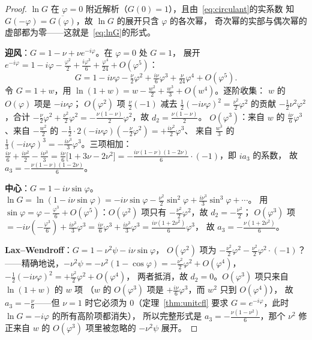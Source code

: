 \begin{proof}
$\ln G$ 在 $\varphi=0$ 附近解析（$G(0)=1$），且由~\eqref{eq:circulant}的实系数
知 $G(-\varphi)=\overline{G(\varphi)}$，故 $\ln G$ 的展开只含 $\varphi$ 的各次幂，
奇次幂的实部与偶次幂的虚部都为零——这就是~\eqref{eq:lnG}的形式。

\textbf{迎风}：$G=1-\nu+\nu e^{-i\varphi}$。在 $\varphi=0$ 处 $G=1$，
展开 $e^{-i\varphi}=1-i\varphi-\tfrac{\varphi^2}{2}+\tfrac{i\varphi^3}{6}+\tfrac{\varphi^4}{24}+O(\varphi^5)$：
\begin{equation}
  G=1-i\nu\varphi-\tfrac{\nu}{2}\varphi^2+\tfrac{i\nu}{6}\varphi^3+\tfrac{\nu}{24}\varphi^4+O(\varphi^5).
\end{equation}
令 $G=1+w$，用 $\ln(1+w)=w-\tfrac{w^2}{2}+\tfrac{w^3}{3}+O(w^4)$。逐阶收集：
$w$ 的 $O(\varphi)$ 项是 $-i\nu\varphi$；
$O(\varphi^2)$ 项 $\tfrac{\nu}{2}(-1)$ 减去 $\tfrac12(-i\nu\varphi)^2=\tfrac{\nu^2}{2}\varphi^2$
的贡献 $-\tfrac12\nu^2\varphi^2$，合计 $-\tfrac{\nu}{2}\varphi^2+\tfrac{\nu^2}{2}\varphi^2
=-\tfrac{\nu(1-\nu)}{2}\varphi^2$，故 $d_2=\tfrac{\nu(1-\nu)}{2}$。
$O(\varphi^3)$：来自 $w$ 的 $\tfrac{i\nu}{6}\varphi^3$、来自 $-\tfrac{w^2}{2}$ 的
$-\tfrac12\cdot 2(-i\nu\varphi)(-\tfrac{\nu}{2}\varphi^2)=+\tfrac{i\nu^2}{2}\varphi^3$、
来自 $\tfrac{w^3}{3}$ 的 $\tfrac13(-i\nu\varphi)^3=-\tfrac{i\nu^3}{3}\varphi^3$。三项相加：
$\tfrac{i\nu}{6}+\tfrac{i\nu^2}{2}-\tfrac{i\nu^3}{3}=\tfrac{i\nu}{6}\bigl[1+3\nu-2\nu^2\bigr]
=-\tfrac{i\nu(1-\nu)(1-2\nu)}{6}\cdot(-1)$，即 $ia_3$ 的系数，
故 $a_3=-\tfrac{\nu(1-\nu)(1-2\nu)}{6}$。

\textbf{中心}：$G=1-i\nu\sin\varphi$。$\ln G=\ln(1-i\nu\sin\varphi)
=-i\nu\sin\varphi-\tfrac{\nu^2}{2}\sin^2\varphi+\tfrac{i\nu^3}{3}\sin^3\varphi+\cdots$。
用 $\sin\varphi=\varphi-\tfrac{\varphi^3}{6}+O(\varphi^5)$：$O(\varphi^2)$ 项只有
$-\tfrac{\nu^2}{2}\varphi^2$，故 $d_2=-\tfrac{\nu^2}{2}$；
$O(\varphi^3)$ 项 $=-i\nu(-\tfrac{\varphi^3}{6})+\tfrac{i\nu^3}{3}\varphi^3
=\tfrac{i\nu}{6}\varphi^3+\tfrac{i\nu^3}{3}\varphi^3=\tfrac{i\nu(1+2\nu^2)}{6}\varphi^3$，
故 $a_3=-\tfrac{\nu(1+2\nu^2)}{6}$。

\textbf{Lax--Wendroff}：$G=1-\nu^2\psi-i\nu\sin\varphi$，
$O(\varphi^2)$ 项为 $-\tfrac{\nu^2}{2}\varphi^2-\tfrac{\nu^2}{2}\varphi^2\cdot(-1)$？
——精确地说，$-\nu^2\psi=-\nu^2(1-\cos\varphi)=-\tfrac{\nu^2}{2}\varphi^2+O(\varphi^4)$，
$-\tfrac12(-i\nu\varphi)^2=+\tfrac{\nu^2}{2}\varphi^2+O(\varphi^4)$，
两者抵消，故 $d_2=0$。$O(\varphi^3)$ 项只来自 $\ln(1+w)$ 的 $w$ 项
（$w$ 的 $O(\varphi^3)$ 项是 $+\tfrac{i\nu}{6}\varphi^3$，而 $w^2$ 只到 $O(\varphi^4)$），
故 $a_3=-\tfrac{\nu}{6}$——但 $\nu=1$ 时它必须为 $0$（定理~\ref{thm:unitcfl} 要求
$G=e^{-i\varphi}$，此时 $\ln G=-i\varphi$ 的所有高阶项都消失），
所以完整形式是 $a_3=-\tfrac{\nu(1-\nu^2)}{6}$，那个 $\nu^2$ 修正来自 $w$ 的
$O(\varphi^3)$ 项里被忽略的 $-\nu^2\psi$ 展开。


\end{proof}
